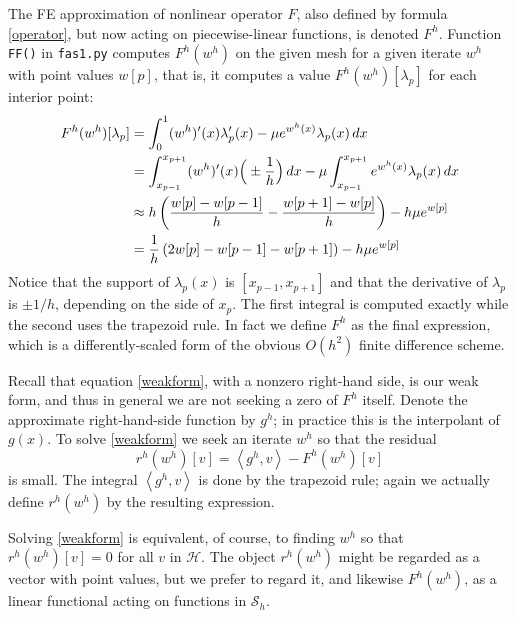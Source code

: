 \documentclass[letterpaper,final,12pt,reqno]{amsart}
\newcommand{\ip}[2]{\left<#1,#2\right>}
\begin{document}
The FE approximation of nonlinear operator $F$, also defined by formula \eqref{operator}, but now acting on piecewise-linear functions, is denoted $F^h$.  Function \texttt{FF()} in \texttt{fas1.py} computes $F^h(w^h)$ on the given mesh for a given iterate $w^h$ with point values $w[p]$, that is, it computes a value $F^h(w^h)[\lambda_p]$ for each interior point:
\begin{align}
  F^h(w^h)[\lambda_p] &= \int_0^1 (w^h)'(x) \lambda_p'(x) - \mu e^{w^h(x)} \lambda_p(x)\, dx  \label{feoperator} \\
    &= \int_{x_{p-1}}^{x_{p+1}} (w^h)'(x) \Big(\pm \frac{1}{h}\Big)\,dx - \mu \int_{x_{p-1}}^{x_{p+1}} e^{w^h(x)} \lambda_p(x)\, dx \notag \\
    &\approx h \left(\frac{w[p]-w[p-1]}{h} - \frac{w[p+1]-w[p]}{h}\right) - h \mu e^{w[p]}  \notag \\
    &= \frac{1}{h}\left(2w[p]-w[p-1]-w[p+1]\right) - h \mu e^{w[p]} \notag
\end{align}
Notice that the support of $\lambda_p(x)$ is $[x_{p-1},x_{p+1}]$ and that the derivative of $\lambda_p$ is $\pm 1/h$, depending on the side of $x_p$.  The first integral is computed exactly while the second uses the trapezoid rule.  In fact we define $F^h$ as the final expression, which is a differently-scaled form of the obvious $O(h^2)$ finite difference scheme.

Recall that equation \eqref{weakform}, with a nonzero right-hand side, is our weak form, and thus in general we are not seeking a zero of $F^h$ itself.  Denote the approximate right-hand-side function by $g^h$; in practice this is the interpolant of $g(x)$.  To solve \eqref{weakform} we seek an iterate $w^h$ so that the residual
\begin{equation}
  r^h(w^h)[v] = \ip{g^h}{v} - F^h(w^h)[v]  \label{feresidual}
\end{equation}
is small.  The integral $\ip{g^h}{v}$ is done by the trapezoid rule; again we actually define $r^h(w^h)$ by the resulting expression.

Solving \eqref{weakform} is equivalent, of course, to finding $w^h$ so that $r^h(w^h)[v]=0$ for all $v$ in $\mathcal{H}$.  The object $r^h(w^h)$ might be regarded as a vector with point values, but we prefer to regard it, and likewise $F^h(w^h)$, as a linear functional acting on functions in $\mathcal{S}_h$.
\end{document}
